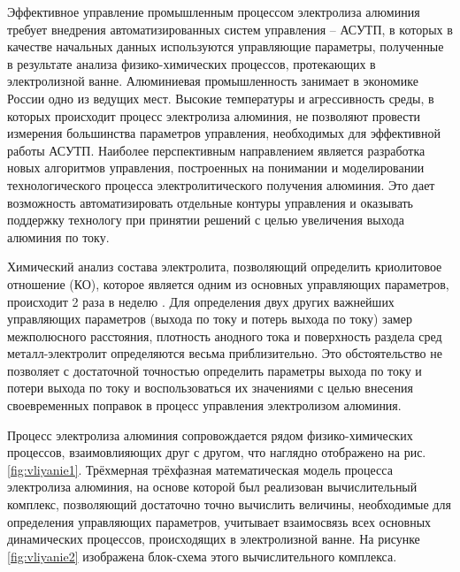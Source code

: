 \documentclass[pdflatex,sn-mathphys-gost]{pmi-jnl}
\begin{document}
Эффективное управление промышленным процессом электролиза алюминия требует внедрения автоматизированных систем управления – АСУТП, в которых в качестве начальных данных используются управляющие параметры, полученные в результате анализа физико-химических процессов, протекающих в электролизной ванне. Алюминиевая промышленность занимает в экономике России одно из ведущих мест. Высокие температуры и агрессивность среды, в которых происходит процесс электролиза алюминия, не позволяют провести измерения большинства параметров управления, необходимых для эффективной работы АСУТП. Наиболее перспективным направлением является разработка новых алгоритмов управления, построенных на понимании и моделировании технологического процесса электролитического получения алюминия. Это дает возможность автоматизировать отдельные контуры управления и оказывать поддержку технологу при принятии решений с целью увеличения выхода алюминия по току.

Химический анализ состава электролита, позволяющий определить криолитовое отношение (КО), которое является одним из основных управляющих параметров, происходит 2 раза в неделю \cite{litlink:belo}. Для определения двух других важнейших управляющих параметров (выхода по току и потерь выхода по току) замер межполюсного расстояния, плотность анодного тока и поверхность раздела сред металл-электролит определяются весьма приблизительно. Это обстоятельство не позволяет с достаточной точностью определить параметры выхода по току и потери выхода по току и воспользоваться их значениями с целью внесения своевременных поправок в процесс управления электролизом алюминия.

Процесс электролиза алюминия сопровождается рядом физико-химических процессов, взаимовлияющих друг с другом, что наглядно отображено на рис. \ref{fig:vliyanie1}. Трёхмерная трёхфазная математическая модель процесса электролиза алюминия, на основе которой был реализован вычислительный комплекс, позволяющий достаточно точно вычислить величины, необходимые для определения управляющих параметров, учитывает взаимосвязь всех основных динамических процессов, происходящих в электролизной ванне. На рисунке \ref{fig:vliyanie2} изображена блок-схема этого вычислительного комплекса.
\end{document}
